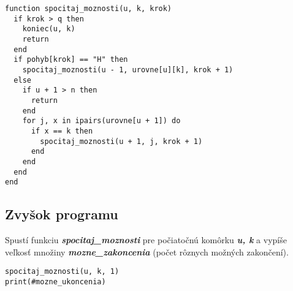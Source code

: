 \documentclass{article}
\begin{document}
\begin{lstlisting}
function spocitaj_moznosti(u, k, krok)
  if krok > q then
    koniec(u, k)
    return
  end
  if pohyb[krok] == "H" then
    spocitaj_moznosti(u - 1, urovne[u][k], krok + 1)
  else
    if u + 1 > n then
      return
    end
    for j, x in ipairs(urovne[u + 1]) do
      if x == k then
        spocitaj_moznosti(u + 1, j, krok + 1)
      end
    end
  end
end

\end{lstlisting}

\subsection{Zvyšok programu}

Spustí funkciu \textbf{\textit{spocitaj\_moznosti}} pre počiatočnú komôrku \textbf{\textit{u, k}} a vypíše veľkosť množiny \textbf{\textit{mozne\_zakoncenia}} (počet rôznych možných zakončení).

\begin{lstlisting}[language={[5.0]Lua}]
spocitaj_moznosti(u, k, 1)
print(#mozne_ukoncenia)
\end{lstlisting}
\end{document}
